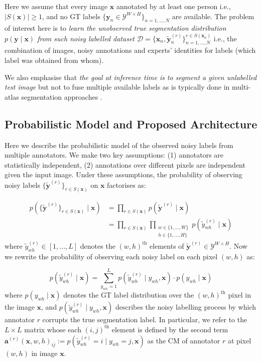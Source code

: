 Here we assume that every image $\mathbf{x}$ annotated by at least one person i.e., $|S(\mathbf{x})|\geq 1$, and no GT labels $\{\textbf{y}_n \in \mathcal{Y}^{W\times H} \}_{n=1,...,N}$ are available. The problem of interest here is to \textit{learn the unobserved true segmentation distribution $p(\textbf{y} \mid \textbf{x})$ from such noisy labelled dataset $\mathcal{D}=\{\textbf{x}_n, \tilde{\textbf{y}}_n^{(r)}\}^{r\in S(\mathbf{x}_n)}_{n=1,...,N}$} i.e., the combination of images, noisy annotations and experts' identities for labels (which label was obtained from whom). 

We also emphasise that \textit{the goal at inference time is to segment a given unlabelled test image} but not to fuse multiple available labels as is typically done in multi-atlas segmentation approaches \cite{iglesias2013unified}. 

\subsection{Probabilistic Model and Proposed Architecture}
Here we describe the probabilistic model of the observed noisy labels from multiple annotators. We make two key assumptions: (1) annotators are statistically independent, (2) annotations over different pixels are independent given the input image. Under these assumptions, the probability of observing noisy labels $\{\tilde{\textbf{y}}^{(r)}\}_{r\in S(\mathbf{x})}$ on $\textbf{x}$ factorises as:

\begin{equation}
\begin{aligned}
   p(\{\tilde{\textbf{y}}^{(r)}\}_{r\in S(\mathbf{x})}\mid \textbf{x}) 
   &=\prod_{r\in S(\mathbf{x})}p(\tilde{\textbf{y}}^{(r)}\mid \textbf{x})  \\
   &= \prod_{r\in S(\mathbf{x})}\prod_{\substack{w\in\{1,...,W\}\\h\in\{1,...,H\}}} p(\tilde{y}^{(r)}_{wh} \mid \textbf{x})
\end{aligned}
\label{eq:joint_probs}
\end{equation}
where $\tilde{y}^{(r)}_{wh} \in [1, ..., L]$ denotes the $(w, h)^{\text{th}}$ elements of $\tilde{\textbf{y}}^{(r)}\in \mathcal{Y}^{W\times H}$. Now we rewrite the probability of observing each noisy label on each pixel $(w, h)$ as: 

\begin{equation}
    p(\tilde{y}^{(r)}_{wh}\mid \textbf{x})= \sum_{y_{wh}= 1}^{L} p(\tilde{y}^{(r)}_{wh}\mid y_{wh},\textbf{x}) \cdot  p(y_{wh}\mid \textbf{x}) 
    \label{eq:confusion_matrix}
\end{equation}
where $p(y_{wh}\mid\textbf{x})$ denotes the GT label distribution over the $(w, h)^{\text{th}}$ pixel in the image $\textbf{x}$, and $p(\tilde{y}^{(r)}_{wh}\mid y_{wh},\textbf{x})$ describes the noisy labelling process by which annotator $r$ corrupts the true segmentation label. In particular, we refer to the $L\times L$ matrix whose each $(i,j)^{\text{th}}$ element is defined by the second term $\textbf{a}^{(r)}(\mathbf{x},w,h)_{ij}:=p(\tilde{y}^{(r)}_{wh}=i\mid y_{wh}=j,\textbf{x})$ as the CM of annotator $r$ at pixel $(w, h)$ in image $\mathbf{x}$. 

